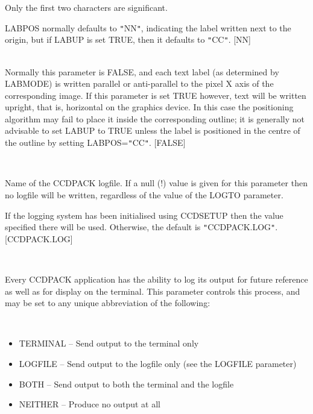 \documentclass[twoside,11pt]{article}
\renewcommand{\_}{\texttt{\symbol{95}}}
\newcommand{\sstsubsection}[1]{ \item[{#1}] \mbox{} \\}
\newcommand{\sstitemlist}[1]{
  \mbox{} \\
  \vspace{-3.5ex}
  \begin{itemize}
     #1
  \end{itemize}
}
\newcommand{\sstitem}{\item}
\newcommand{\sstsubsection}[1]{\item[{#1}]}
\newcommand{\sstitemlist}[1]{
      \begin{itemize}
         #1
      \end{itemize}
      \\
   }
\newcommand{\sstitem}{\item}
\begin{document}
{{{         Only the first two characters are significant.

         LABPOS normally defaults to {\tt "}NN{\tt "}, indicating the label written
         next to the origin, but if LABUP is set TRUE, then it
         defaults to {\tt "}CC{\tt "}.
         [NN]
      }
      \sstsubsection{
         LABUP = \_LOGICAL (Read)
      }{
         Normally this parameter is FALSE, and each text label (as
         determined by LABMODE) is written parallel or anti-parallel
         to the pixel X axis of the corresponding image.  If this
         parameter is set TRUE however, text will be written upright,
         that is, horizontal on the graphics device.  In this case
         the positioning algorithm may fail to place it inside the
         corresponding outline; it is generally not advisable to
         set LABUP to TRUE unless the label is positioned in the
         centre of the outline by setting LABPOS={\tt "}CC{\tt "}.
         [FALSE]
      }
      \sstsubsection{
         LOGFILE = FILENAME (Read)
      }{
         Name of the CCDPACK logfile.  If a null (!) value is given for
         this parameter then no logfile will be written, regardless of
         the value of the LOGTO parameter.

         If the logging system has been initialised using CCDSETUP
         then the value specified there will be used. Otherwise, the
         default is {\tt "}CCDPACK.LOG{\tt "}.
         [CCDPACK.LOG]
      }
      \sstsubsection{
         LOGTO = LITERAL (Read)
      }{
         Every CCDPACK application has the ability to log its output
         for future reference as well as for display on the terminal.
         This parameter controls this process, and may be set to any
         unique abbreviation of the following:
         \sstitemlist{

            \sstitem
               TERMINAL  -- Send output to the terminal only

            \sstitem
               LOGFILE   -- Send output to the logfile only (see the
                               LOGFILE parameter)

            \sstitem
               BOTH      -- Send output to both the terminal and the
                               logfile

            \sstitem
               NEITHER   -- Produce no output at all

}}}}
\end{document}
